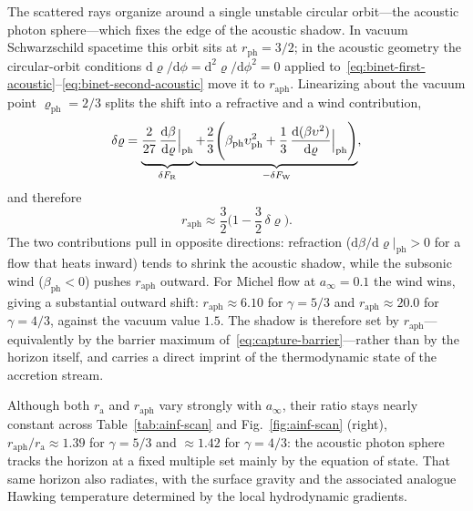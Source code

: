 \documentclass[12pt,a4paper,preprint]{elsarticle}
\begin{document}
            The scattered rays organize around a single unstable circular orbit---the acoustic photon sphere---which fixes the edge of the acoustic shadow. In vacuum Schwarzschild spacetime this orbit sits at $r_{\mathrm{ph}}=3/2$; in the acoustic geometry the circular-orbit conditions $\mathrm{d}\varrho/\mathrm{d}\phi=\mathrm{d}^{2}\varrho/\mathrm{d}\phi^{2}=0$ applied to~\eqref{eq:binet-first-acoustic}--\eqref{eq:binet-second-acoustic} move it to $r_{\mathrm{aph}}$. Linearizing about the vacuum point $\varrho_{\mathrm{ph}}=2/3$ splits the shift into a refractive and a wind contribution,
            \begin{equation}
                \delta\varrho = \underbrace{\vphantom{\Biggl( \beta_{\mathrm{ph}}\upsilon^{2}_{\mathrm{ph}} + \frac{1}{3}\,\frac{\mathrm{d}(\beta\upsilon^{2})}{\mathrm{d}\varrho}\Big|_{\mathrm{ph}} \Biggr)}\frac{2}{27}\,\frac{\mathrm{d}\beta}{\mathrm{d}\varrho}\Big|_{\mathrm{ph}}}_{\delta F_{\mathrm{R}}} \underbrace{+ \frac{2}{3}\Biggl( \beta_{\mathrm{ph}}\upsilon^{2}_{\mathrm{ph}} + \frac{1}{3}\,\frac{\mathrm{d}(\beta\upsilon^{2})}{\mathrm{d}\varrho}\Big|_{\mathrm{ph}} \Biggr)}_{-\delta F_{\mathrm{W}}} ,
                \label{eq:acoustic-photon-sphere-delta}
            \end{equation}
            and therefore
            \begin{equation}
                r_{\mathrm{aph}} \approx \frac{3}{2}\Biggl(1 - \frac{3}{2}\,\delta\varrho\Biggr) .
                \label{eq:raph-from-delta}
            \end{equation}
            The two contributions pull in opposite directions: refraction ($\mathrm{d}\beta/\mathrm{d}\varrho|_{\mathrm{ph}}>0$ for a flow that heats inward) tends to shrink the acoustic shadow, while the subsonic wind ($\beta_{\mathrm{ph}}<0$) pushes $r_{\mathrm{aph}}$ outward. For Michel flow at $a_{\infty}=0.1$ the wind wins, giving a substantial outward shift: $r_{\mathrm{aph}}\approx 6.10$ for $\gamma=5/3$ and $r_{\mathrm{aph}}\approx 20.0$ for $\gamma=4/3$, against the vacuum value $1.5$. The shadow is therefore set by $r_{\mathrm{aph}}$---equivalently by the barrier maximum of~\eqref{eq:capture-barrier}---rather than by the horizon itself, and carries a direct imprint of the thermodynamic state of the accretion stream.

            Although both $r_{\mathrm{a}}$ and $r_{\mathrm{aph}}$ vary strongly with $a_{\infty}$, their ratio stays nearly constant across Table~\ref{tab:ainf-scan} and Fig.~\ref{fig:ainf-scan} (right), $r_{\mathrm{aph}}/r_{\mathrm{a}}\approx 1.39$ for $\gamma=5/3$ and $\approx 1.42$ for $\gamma=4/3$: the acoustic photon sphere tracks the horizon at a fixed multiple set mainly by the equation of state. That same horizon also radiates, with the surface gravity and the associated analogue Hawking temperature determined by the local hydrodynamic gradients.
\end{document}
